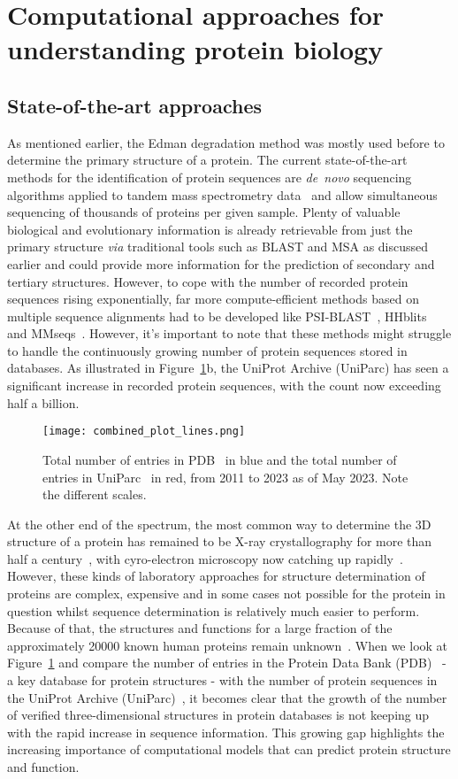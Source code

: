 \section{Computational approaches for understanding protein biology}
\subsection*{State-of-the-art approaches}
As mentioned earlier, the Edman degradation method was mostly used before to determine the primary structure of a protein. The current state-of-the-art methods for the identification of protein sequences are \mbox{\textit{de novo}} sequencing algorithms applied to tandem mass spectrometry data~\cite{protseq} and allow simultaneous sequencing of thousands of proteins per given sample. Plenty of valuable biological and evolutionary information is already retrievable from just the primary structure \textit{via} traditional tools such as BLAST and MSA as discussed earlier and could provide more information for the prediction of secondary and tertiary structures. However, to cope with the number of recorded protein sequences rising exponentially, far more compute-efficient methods based on multiple sequence alignments had to be developed like PSI-BLAST~\cite{psiblast}, HHblits~\cite{hhblits3} and MMseqs~\cite{mmseqs2}. However, it's important to note that these methods might struggle to handle the continuously growing number of protein sequences stored in databases. As illustrated in Figure~\ref{fig:pdb}b, the UniProt Archive (UniParc) has seen a significant increase in recorded protein sequences, with the count now exceeding half a billion.

\begin{figure}[!ht]
    \centering
    \texttt{[image: combined\_plot\_lines.png]}
    \caption{Total number of entries in PDB~\cite{pdb} in blue and the total number of entries in UniParc~\cite{uniprot} in red, from 2011 to 2023 as of May 2023. Note the different scales.}
    \label{fig:pdb}
\end{figure}

At the other end of the spectrum, the most common way to determine the 3D structure of a protein has remained to be X-ray crystallography for more than half a century~\cite{xray}, with cyro-electron microscopy now catching up rapidly~\cite{cyroem}. However, these kinds of laboratory approaches for structure determination of proteins are complex, expensive and in some cases not possible for the protein in question whilst sequence determination is relatively much easier to perform. Because of that, the structures and functions for a large fraction of the approximately 20000 known human proteins remain unknown~\cite{coverage}. When we look at Figure~\ref{fig:pdb} and compare the number of entries in the Protein Data Bank (PDB)~\cite{pdb} - a key database for protein structures - with the number of protein sequences in the UniProt Archive (UniParc)~\cite{uniprot}, it becomes clear that the growth of the number of verified three-dimensional structures in protein databases is not keeping up with the rapid increase in sequence information. This growing gap highlights the increasing importance of computational models that can predict protein structure and function.

